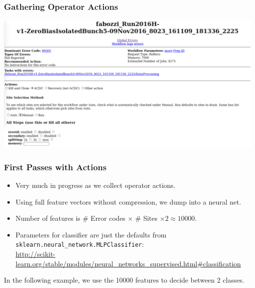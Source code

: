 \documentclass{beamer}
\begin{document}
\begin{frame}
  \frametitle{Gathering Operator Actions}

  \includegraphics[width=\linewidth]{decision.png}

\end{frame}

\begin{frame}
  \frametitle{First Passes with Actions}

  \begin{itemize}
  \item Very much in progress as we collect operator actions.
  \item Using full feature vectors without compression, we dump into a neural net.
  \item Number of features is \# Error codes $\times$ \# Sites $\times 2 \approx 10000$.
  \item Parameters for classifier are just the defaults from
    \texttt{sklearn.neural\_network.MLPClassifier}: \\
    \url{http://scikit-learn.org/stable/modules/neural_networks_supervised.html#classification}
  \end{itemize}

  In the following example, we use the 10000 features to decide between 2 classes.

\end{frame}
\end{document}
